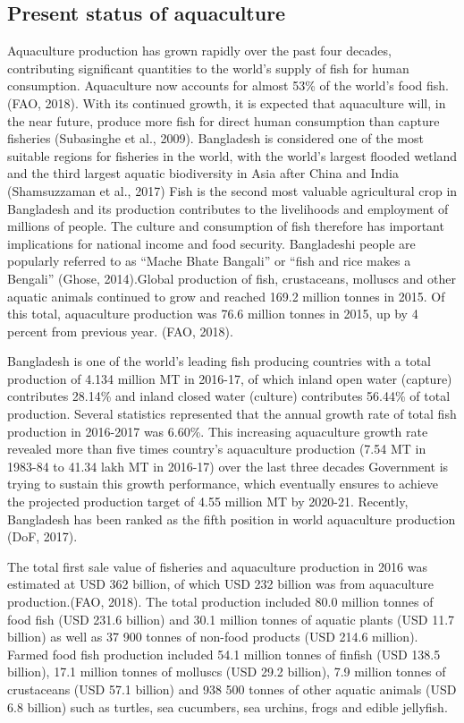 \documentclass[
]{book}
\begin{document}
\hypertarget{present-status-of-aquaculture}{%
\subsection{Present status of aquaculture}\label{present-status-of-aquaculture}}

Aquaculture production has grown rapidly over the past four decades,
contributing significant quantities to the world's supply of fish for
human consumption. Aquaculture now accounts for almost 53\% of the
world's food fish. (FAO, 2018). With its continued growth, it is
expected that aquaculture will, in the near future, produce more fish
for direct human consumption than capture fisheries (Subasinghe et al.,
2009). Bangladesh is considered one of the most suitable regions for
fisheries in the world, with the world's largest flooded wetland and the
third largest aquatic biodiversity in Asia after China and India
(Shamsuzzaman et al., 2017) Fish is the second most valuable
agricultural crop in Bangladesh and its production contributes to the
livelihoods and employment of millions of people. The culture and
consumption of fish therefore has important implications for national
income and food security. Bangladeshi people are popularly referred to
as ``Mache Bhate Bangali'' or ``fish and rice makes a Bengali'' (Ghose,
2014).Global production of fish, crustaceans, molluscs and other aquatic
animals continued to grow and reached 169.2 million tonnes in 2015. Of
this total, aquaculture production was 76.6 million tonnes in 2015, up
by 4 percent from previous year. (FAO, 2018).

Bangladesh is one of the world's leading fish producing countries with a
total production of 4.134 million MT in 2016-17, of which inland open
water (capture) contributes 28.14\% and inland closed water (culture)
contributes 56.44\% of total production. Several statistics represented
that the annual growth rate of total fish production in 2016-2017 was
6.60\%. This increasing aquaculture growth rate revealed more than five
times country's aquaculture production (7.54 MT in 1983-84 to 41.34 lakh
MT in 2016-17) over the last three decades Government is trying to
sustain this growth performance, which eventually ensures to achieve the
projected production target of 4.55 million MT by 2020-21. Recently,
Bangladesh has been ranked as the fifth position in world aquaculture
production (DoF, 2017).

The total first sale value of fisheries and aquaculture production in
2016 was estimated at USD 362 billion, of which USD 232 billion was from
aquaculture production.(FAO, 2018). The total production included 80.0
million tonnes of food fish (USD 231.6 billion) and 30.1 million tonnes
of aquatic plants (USD 11.7 billion) as well as 37 900 tonnes of
non-food products (USD 214.6 million). Farmed food fish production
included 54.1 million tonnes of finfish (USD 138.5 billion), 17.1
million tonnes of molluscs (USD 29.2 billion), 7.9 million tonnes of
crustaceans (USD 57.1 billion) and 938 500 tonnes of other aquatic
animals (USD 6.8 billion) such as turtles, sea cucumbers, sea urchins,
frogs and edible jellyfish.
\end{document}
